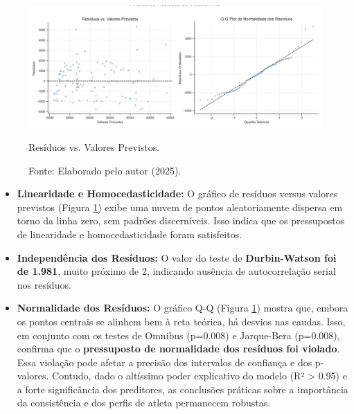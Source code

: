 \begin{figure}[H]
    \centering
    \begin{minipage}{1\textwidth}
        \centering
        \includegraphics[width=\linewidth]{Imagens/analise_residuos_modelo.png}
        \caption{Resíduos vs. Valores Previstos.}
        \label{fig:residuos}
    \end{minipage}\hfill
    \caption*{Fonte: Elaborado pelo autor (2025).}
\end{figure}

\begin{itemize}
    \item \textbf{Linearidade e Homocedasticidade:} O gráfico de resíduos versus valores previstos (Figura \ref{fig:residuos}) exibe uma nuvem de pontos aleatoriamente dispersa em torno da linha zero, sem padrões discerníveis. Isso indica que os pressupostos de linearidade e homocedasticidade foram satisfeitos.
    \item \textbf{Independência dos Resíduos:} O valor do teste de \textbf{Durbin-Watson foi de 1.981}, muito próximo de 2, indicando ausência de autocorrelação serial nos resíduos.
    \item \textbf{Normalidade dos Resíduos:} O gráfico Q-Q (Figura \ref{fig:residuos}) mostra que, embora os pontos centrais se alinhem bem à reta teórica, há desvios nas caudas. Isso, em conjunto com os testes de Omnibus (p=0.008) e Jarque-Bera (p=0.008), confirma que o \textbf{pressuposto de normalidade dos resíduos foi violado}. Essa violação pode afetar a precisão dos intervalos de confiança e dos p-valores. Contudo, dado o altíssimo poder explicativo do modelo (R² > 0.95) e a forte significância dos preditores, as conclusões práticas sobre a importância da consistência e dos perfis de atleta permanecem robustas.
\end{itemize}

